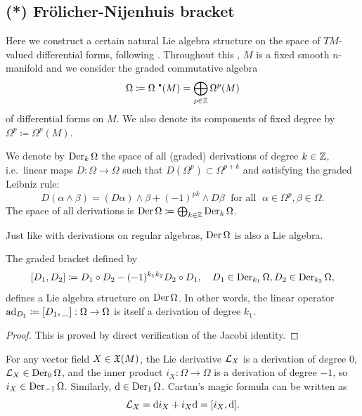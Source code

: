 \subsection{(*) Fr\"olicher-Nijenhuis bracket}\label{sec: Frolicher}


Here we construct a certain natural Lie algebra structure on the space of $TM$-valued differential forms, following \cite{Kolar}. Throughout this \subsect, $M$ is a fixed smooth $n$-manifold and we consider the graded commutative algebra 
\[\Omega\coloneqq \Omega^{\smbullet}(M)=\bigoplus_{p\in\bbZ} \Omega^p(M)\] of differential forms on $M$. We also denote its components of fixed degree by $\Omega^p\coloneqq \Omega^p(M)$. 

\begin{defn}
    We denote by $\operatorname{Der}_k\Omega$ the space of all (graded) derivations of degree $k\in\mathbb{Z}$, i.e.\ linear maps $D:\Omega\to \Omega$ such that $D(\Omega^p)\subset \Omega^{p+k}$ and satisfying the graded Leibniz rule:
    \[D(\alpha\wedge\beta)=(D\alpha)\wedge\beta+(-1)^{pk}\wedge D\beta \;\text{ for all }\;\alpha\in\Omega^p,\beta\in\Omega.\]
    The space of all derivations is $\operatorname{Der}\Omega\coloneqq \bigoplus_{k\in\mathbb{Z}} \operatorname{Der}_k\Omega$.
\end{defn}

Just like with derivations on regular algebras, $\operatorname{Der}\Omega$ is also a Lie algebra.

\begin{lem}
    The graded bracket defined by
    \[[D_1,D_2]\coloneqq D_1\circ D_2-(-1)^{k_1k_2}D_2\circ D_1,\quad D_1\in\operatorname{Der}_{k_1}\Omega,D_2\in\operatorname{Der}_{k_2}\Omega,\]
    defines a Lie algebra structure on $\operatorname{Der}\Omega$. In other words, the linear operator $\mathrm{ad}_{D_1}\coloneqq [D_1,\_]:\Omega\to \Omega$ is itself a derivation of degree $k_1$.
\end{lem}
\begin{proof}
    This is proved by direct verification of the Jacobi identity.
\end{proof}

\begin{example}
    For any vector field $X\in\mathfrak{X}(M)$, the Lie derivative $\mathcal{L}_X$ is a derivation of degree $0$, $\mathcal{L}_X\in\operatorname{Der}_0\Omega$, and the inner product $i_X:\Omega\to \Omega$ is a derivation of degree $-1$, so $i_X\in\operatorname{Der}_{-1}\Omega$. Similarly, ${\mathrm{d}}\in\operatorname{Der}_1\Omega$. Cartan's magic formula can be written as 
    \[\mathcal{L}_X={\mathrm{d}} i_X+i_X {\mathrm{d}}=[i_X,{\mathrm{d}}].\]
\end{example}

